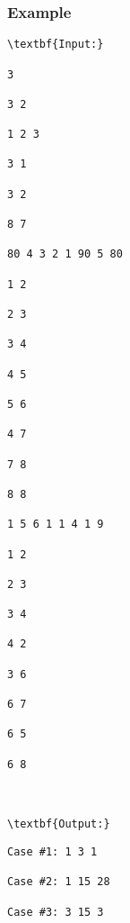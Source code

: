 \subsubsection{Example}
\begin{verbatim}
\textbf{Input:}

3

3 2

1 2 3

3 1

3 2

8 7

80 4 3 2 1 90 5 80

1 2

2 3

3 4

4 5

5 6

4 7

7 8

8 8

1 5 6 1 1 4 1 9

1 2

2 3

3 4

4 2

3 6

6 7

6 5

6 8



\textbf{Output:}\end{verbatim}
\begin{verbatim}
Case #1: 1 3 1

Case #2: 1 15 28

Case #3: 3 15 3

\end{verbatim}